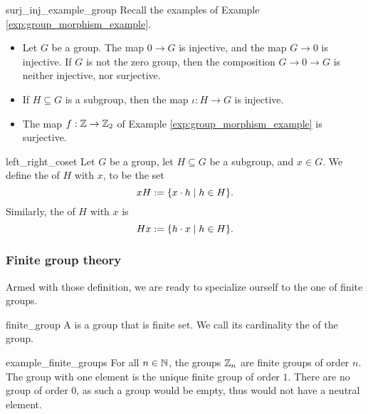\begin{cexp}{}{surj_inj_example_group}
    Recall the examples of Example \ref{exp:group_morphism_example}.
    \begin{itemize}
        \item Let \( G \) be a group. The map \( 0 \to G \) is injective, and the map \( G \to 0 \) is injective. If \( G \) is not the zero group, then the composition \( G \to 0 \to G \) is neither injective, nor surjective.
        \item If \( H \subseteq G \) is a subgroup, then the map \( \iota : H \to G \) is injective.
        \item The map \( f : \mathbb{Z} \to \mathbb{Z}_2 \) of Example \ref{exp:group_morphism_example} is surjective. 
    \end{itemize}
\end{cexp}

\begin{cdef}{}{left_right_coset}
    Let \( G \) be a group, let \( H \subseteq G \) be a subgroup, and \( x \in G \). We define the  of \( H \) with \( x \), to be the set
    \begin{equation*}
        x H := \{ x \cdot h \mid h \in H \}.
    \end{equation*}
    Similarly, the  of \( H \) with \( x \) is
    \begin{equation*}
        H x := \{ h \cdot x \mid h \in H \}.
    \end{equation*}
\end{cdef}

\subsubsection{Finite group theory}

Armed with those definition, we are ready to specialize ourself to the one of finite groups. 
\begin{cdef}{}{finite_group}
    A  is a group that is finite set. We call its cardinality the  of the group.
\end{cdef}

\begin{cex}{}{example_finite_groups}
    For all \( n \in \mathbb{N} \), the groups \( \mathbb{Z}_n \) are finite groups of order \( n \). The group with one element is the unique finite group of order \( 1 \). There are no group of order \( 0 \), as such a group would be empty, thus would not have a neutral element.
\end{cex}